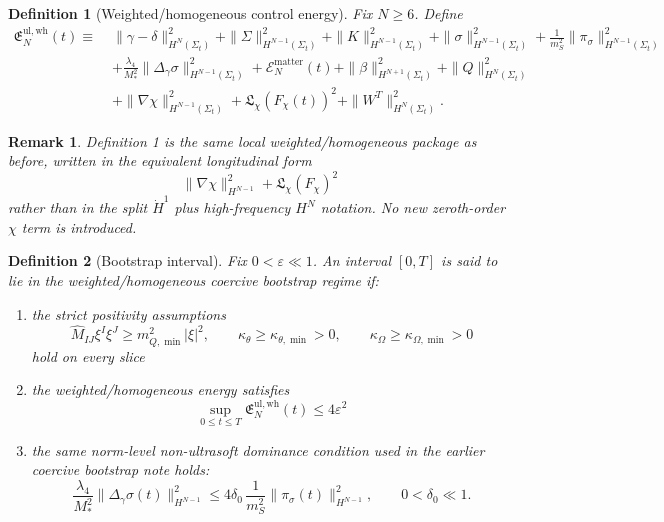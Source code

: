 \documentclass[11pt]{article}
\newtheorem{definition}{Definition}
\newtheorem{remark}{Remark}
\begin{document}
\begin{definition}[Weighted/homogeneous control energy]
Fix \(N\ge 6\). Define
\begin{align}
\mathfrak E_N^{\mathrm{ul,wh}}(t)
\equiv\;&
\|\gamma-\delta\|_{H^N(\Sigma_t)}^2
+ \|\Sigma\|_{H^{N-1}(\Sigma_t)}^2
+ \|K\|_{H^{N-1}(\Sigma_t)}^2
+ \|\sigma\|_{H^{N-1}(\Sigma_t)}^2
+ \frac{1}{m_S^2}\|\pi_\sigma\|_{H^{N-1}(\Sigma_t)}^2
\nonumber\\
&+
\frac{\lambda_4}{M_*^2}\|\Delta_\gamma \sigma\|_{H^{N-1}(\Sigma_t)}^2
+ \mathcal E_N^{\mathrm{matter}}(t)
+ \|\beta\|_{H^{N+1}(\Sigma_t)}^2
+ \|Q\|_{H^N(\Sigma_t)}^2
\nonumber\\
&+
\|\nabla\chi\|_{H^{N-1}(\Sigma_t)}^2
+ \mathfrak L_\chi(F_\chi(t))^2
+ \|W^T\|_{H^N(\Sigma_t)}^2.
\label{eq:Ewh}
\end{align}
\end{definition}

\begin{remark}
Definition 1 is the same local weighted/homogeneous package as before, written in the equivalent longitudinal form
\[
\|\nabla\chi\|_{H^{N-1}}^2 + \mathfrak L_\chi(F_\chi)^2
\]
rather than in the split \(\dot H^1\) plus high-frequency \(H^N\) notation. No new zeroth-order \(\chi\) term is introduced.
\end{remark}

\begin{definition}[Bootstrap interval]
Fix \(0<\varepsilon\ll 1\). An interval \([0,T]\) is said to lie in the \emph{weighted/homogeneous coercive bootstrap regime} if:
\begin{enumerate}
    \item the strict positivity assumptions
    \begin{equation}
    \widehat M_{IJ}\xi^I\xi^J\ge m_{Q,\min}^2|\xi|^2,
    \qquad
    \kappa_\theta\ge \kappa_{\theta,\min}>0,
    \qquad
    \kappa_\Omega\ge \kappa_{\Omega,\min}>0
    \label{eq:strict}
    \end{equation}
    hold on every slice
    \item the weighted/homogeneous energy satisfies
    \begin{equation}
    \sup_{0\le t\le T}\mathfrak E_N^{\mathrm{ul,wh}}(t)\le 4\varepsilon^2
    \label{eq:bootenergy}
    \end{equation}
    \item the same norm-level non-ultrasoft dominance condition used in the earlier coercive bootstrap note holds:
    \begin{equation}
    \frac{\lambda_4}{M_*^2}\|\Delta_\gamma\sigma(t)\|_{H^{N-1}}^2
    \le
    4\delta_0\,\frac{1}{m_S^2}\|\pi_\sigma(t)\|_{H^{N-1}}^2,
    \qquad
    0<\delta_0\ll 1.
    \label{eq:dominance}
    \end{equation}
\end{enumerate}
\end{definition}
\end{document}
